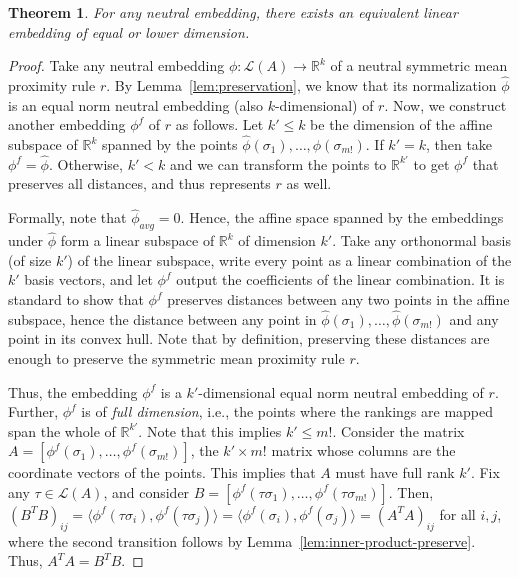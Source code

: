 \documentclass[10pt,letterpaper]{article}
\newcommand{\calL}{{\mathcal{L}}}
\newcommand{\rank}{{\calL(A)}}
\newtheorem{theorem}{Theorem}
\begin{document}
\begin{theorem}
For any neutral embedding, there exists an equivalent linear embedding of equal or lower dimension. 
\label{thm:neutral-linear}
\end{theorem}
\begin{proof}
Take any neutral embedding $\phi : \rank \rightarrow \mathbb{R}^k$ of a neutral symmetric mean proximity rule $r$. By Lemma~\ref{lem:preservation}, we know that its normalization $\hat{\phi}$ is an equal norm neutral embedding (also $k$-dimensional) of $r$. Now, we construct another embedding $\phi^f$ of $r$ as follows. Let $k' \le k$ be the dimension of the affine subspace of $\mathbb{R}^k$ spanned by the points $\hat{\phi}(\sigma_1),\ldots,\hat{\phi}(\sigma_{m!})$. If $k' = k$, then take $\phi^f = \hat{\phi}$. Otherwise, $k' < k$ and we can transform the points to $\mathbb{R}^{k'}$ to get $\phi^f$ that preserves all distances, and thus represents $r$ as well. 

Formally, note that $\hat{\phi}_{avg} = 0$. Hence, the affine space spanned by the embeddings under $\hat{\phi}$ form a linear subspace of $\mathbb{R}^k$ of dimension $k'$. Take any orthonormal basis (of size $k'$) of the linear subspace, write every point as a linear combination of the $k'$ basis vectors, and let $\phi^f$ output the coefficients of the linear combination. It is standard to show that $\phi^f$ preserves distances between any two points in the affine subspace, hence the distance between any point in $\hat{\phi}(\sigma_1),\ldots,\hat{\phi}(\sigma_{m!})$ and any point in its convex hull. Note that by definition, preserving these distances are enough to preserve the symmetric mean proximity rule $r$. 

Thus, the embedding $\phi^f$ is a $k'$-dimensional equal norm neutral embedding of $r$. Further, $\phi^f$ is of \emph{full dimension}, i.e., the points where the rankings are mapped span the whole of $\mathbb{R}^{k'}$. Note that this implies $k' \le m!$. Consider the matrix $A = [\phi^f(\sigma_1), \ldots, \phi^f(\sigma_{m!})]$, the $k' \times m!$ matrix whose columns are the coordinate vectors of the points. This implies that $A$ must have full rank $k'$. Fix any $\tau \in \rank$, and consider $B = [\phi^f(\tau \sigma_1), \ldots, \phi^f(\tau \sigma_{m!})]$. Then, $(B^T B)_{ij} = \langle \phi^f(\tau \sigma_i), \phi^f(\tau \sigma_j) \rangle = \langle \phi^f(\sigma_i), \phi^f(\sigma_j) \rangle = (A^T A)_{ij}$ for all $i,j$, where the second transition follows by Lemma~\ref{lem:inner-product-preserve}. Thus, $A^T A = B^T B$.


\end{proof}
\end{document}

